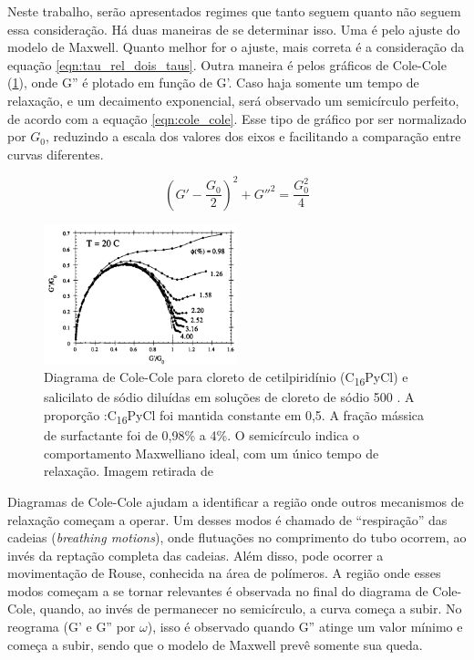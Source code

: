 		Neste trabalho, serão apresentados regimes que tanto seguem quanto não seguem essa consideração. Há duas maneiras de se determinar isso. Uma é pelo ajuste do modelo de Maxwell. %
	    Quanto melhor for o ajuste, mais correta é a consideração da equação \ref{eqn:tau_rel_dois_taus}. Outra maneira é pelos gráficos de Cole-Cole (\ref{fig:colecole_berret}), onde G'' é plotado em função de G'. Caso haja somente um tempo de relaxação, e um decaimento exponencial, será observado um semicírculo perfeito, de acordo com a equação \ref{eqn:cole_cole}. Esse tipo de gráfico por ser normalizado por \(G_0\), reduzindo a escala dos valores dos eixos e facilitando a comparação entre curvas diferentes.
		
		\begin{equation}
			\left(G' - \frac{G_0}{2}\right)^2 + G''^2 = \frac{G_0^2}{4}
			\label{eqn:cole_cole}
		\end{equation} 
		
		\begin{figure}[h]
			\centering
			\includegraphics[width=0.5\textwidth]{imagens/artigos/ColeCole_Berret_Appel_Porte_1993}
			\caption{Diagrama de Cole-Cole para cloreto de cetilpiridínio (C\textsubscript{16}PyCl) e salicilato de sódio diluídas em soluções de cloreto de sódio 500 \mM. A proporção \Sal:C\textsubscript{16}PyCl foi mantida constante em 0,5. A fração mássica de surfactante foi de 0,98\% a 4\%. O semicírculo indica o comportamento Maxwelliano ideal, com um único tempo de relaxação. Imagem retirada de 
		}
			\label{fig:colecole_berret}
		\end{figure}

		 
		
		Diagramas de Cole-Cole ajudam a identificar a região onde outros mecanismos de relaxação começam a operar. Um desses modos é chamado de ``respiração'' das cadeias (\emph{breathing motions}), onde flutuações no comprimento do tubo ocorrem, ao invés da reptação completa das cadeias. Além disso, pode ocorrer a movimentação de Rouse, conhecida na área de polímeros. %
		A região onde esses modos começam a se tornar relevantes é observada no final do diagrama de Cole-Cole, quando, ao invés de permanecer no semicírculo, a curva começa a subir. No reograma (G' e G'' por \(\omega\)), isso é observado quando G'' atinge um valor mínimo e começa a subir, sendo que o modelo de Maxwell prevê somente sua queda.
		
